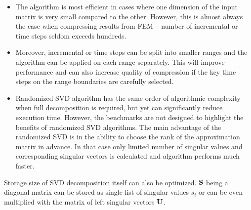 \begin{itemize}
\item The algorithm is most efficient in cases where one dimension of the input matrix is very small compared to the other. However, this is almost always the case when compressing results from FEM -- number of incremental or time steps seldom exceeds hundreds.
\item Moreover, incremental or time steps can be split into smaller ranges and the algorithm can be applied on each range separately. This will improve performance and can also increase quality of compression if the key time steps on the range boundaries are carefully selected.
\item Randomized SVD algorithm has the same order of algorithmic complexity when full decomposition is required, but yet can significantly reduce execution time. However, the benchmarks are not designed to highlight the benefits of randomized SVD algorithms. The main advantage of the randomized SVD is in the ability to choose the rank of the approximation matrix in advance. In that case only limited number of singular values and corresponding singular vectors is calculated and algorithm performs much faster.
\end{itemize}

Storage size of SVD decomposition itself can also be optimized. $\mathbf{S}$ being a diagonal matrix can be stored as single list of singular values $s_{i}$ or can be even multiplied with the matrix of left singular vectors $\mathbf{U}$.

